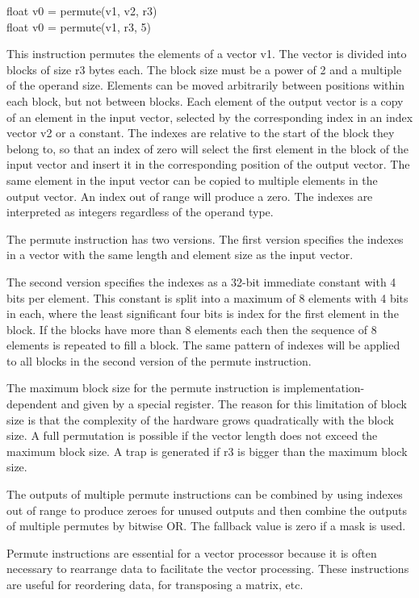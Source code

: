 \documentclass[forwardcom.tex]{subfiles}
\begin{document}
float v0 = permute(v1, v2, r3) \\
float v0 = permute(v1, r3, 5) \\
\vv

This instruction permutes the elements of a vector v1. The vector is divided into blocks of size r3 bytes each. The block size must be a power of 2 and a multiple of the operand size. Elements can be moved arbitrarily between positions within each block, but not between blocks. Each element of the output vector is a copy of an element in the input vector, selected by the corresponding index in an index vector v2 or a constant. The indexes are relative to the start of the block they belong to, so that an index of zero will select the first element in the block of the input vector and insert it in the corresponding position of the output vector. The same element in the input vector can be copied to multiple elements in the output vector. An index out of range will produce a zero. The indexes are interpreted as integers regardless of the operand type.
\vv

The permute instruction has two versions. The first version specifies the indexes in a vector with the same length and element size as the input vector.
\vv

The second version specifies the indexes as a 32-bit immediate constant with 4 bits per element. This constant is split into a maximum of 8 elements with 4 bits in each, where the least significant four bits is index for the first element in the block.
If the blocks have more than 8 elements each then the sequence of 8 elements is repeated to fill a block. The same pattern of indexes will be applied to all blocks in the second version of the permute instruction.
\vv

The maximum block size for the permute instruction is implementation-dependent and given by a special register. The reason for this limitation of block size is that the complexity of the hardware grows quadratically with the block size. A full permutation is possible if the vector length does not exceed the maximum block size. A trap is generated if r3 is bigger than the maximum block size.
\vv

The outputs of multiple permute instructions can be combined by using indexes out of range to produce zeroes for unused outputs and then combine the outputs of multiple permutes by bitwise OR. 
The fallback value is zero if a mask is used.
\vv

Permute instructions are essential for a vector processor because it is often necessary to rearrange data to facilitate the vector processing. These instructions are useful for reordering data, for transposing a matrix, etc. 
\vv
\end{document}
